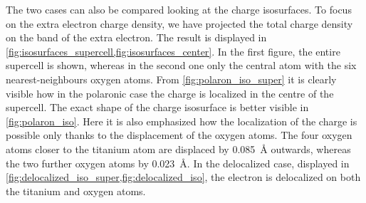 The two cases can also be compared looking at the charge isosurfaces.
To focus on the extra electron charge density, we have projected the total charge density on the band of the extra electron. The result is displayed in \cref{fig:isosurfaces_supercell,fig:isosurfaces_center}. In the first figure, the entire supercell is shown, whereas in the second one only the central atom with the six nearest-neighbours oxygen atoms. From \cref{fig:polaron_iso_super} it is clearly visible how in the polaronic case the charge is localized in the centre of the supercell. The exact shape of the charge isosurface is better visible in \cref{fig:polaron_iso}. Here it is also emphasized how the localization of the charge is possible only thanks to the displacement of the oxygen atoms. The four oxygen atoms closer to the titanium atom are displaced by \SI{0.085}{\angstrom} outwards, whereas the two further oxygen atoms by \SI{0.023}{\angstrom}. In the delocalized case, displayed in \cref{fig:delocalized_iso_super,fig:delocalized_iso}, the electron is delocalized on both the titanium and oxygen atoms.


